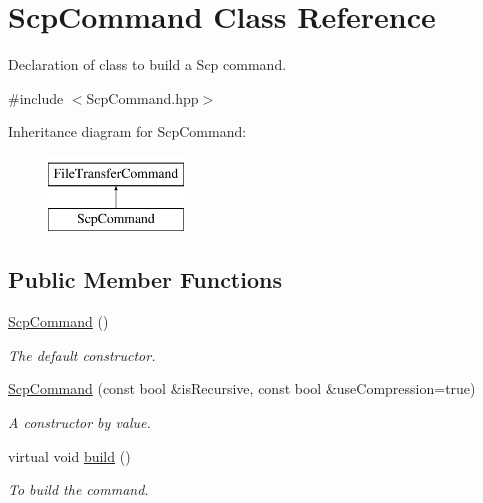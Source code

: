 \hypertarget{classScpCommand}{
\section{ScpCommand Class Reference}
\label{classScpCommand}
}


Declaration of class to build a Scp command.  




{\ttfamily \#include $<$ScpCommand.hpp$>$}

Inheritance diagram for ScpCommand:\begin{figure}[H]
\begin{center}
\leavevmode
\includegraphics[height=2.000000cm]{classScpCommand}
\end{center}
\end{figure}
\subsection*{Public Member Functions}
\begin{DoxyCompactItemize}
\item 
\hypertarget{classScpCommand_a1d914b23e512b52dbd984beccf00bf99}{
\hyperlink{classScpCommand_a1d914b23e512b52dbd984beccf00bf99}{ScpCommand} ()}
\label{classScpCommand_a1d914b23e512b52dbd984beccf00bf99}

\begin{DoxyCompactList}\small\item\em The default constructor. \item\end{DoxyCompactList}\item 
\hyperlink{classScpCommand_a185883670dee70adb970441bc572ea82}{ScpCommand} (const bool \&isRecursive, const bool \&useCompression=true)
\begin{DoxyCompactList}\small\item\em A constructor by value. \item\end{DoxyCompactList}\item 
\hypertarget{classScpCommand_a766b2538f53300b16918eb6d0670037c}{
virtual void \hyperlink{classScpCommand_a766b2538f53300b16918eb6d0670037c}{build} ()}
\label{classScpCommand_a766b2538f53300b16918eb6d0670037c}

\begin{DoxyCompactList}\small\item\em To build the command. \item\end{DoxyCompactList}\end{DoxyCompactItemize}


